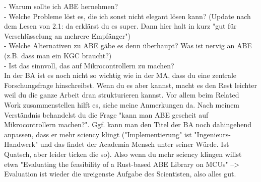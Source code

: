 - Warum sollte ich ABE hernehmen?\\ 
- Welche Probleme löst es, die ich sonst nicht elegant lösen kann? (Update nach dem Lesen von 2.1: da erklärst du es super. Dann hier halt in kurz "gut für Verschlüsselung an mehrere Empfänger") \\
- Welche Alternativen zu ABE gäbe es denn überhaupt? Was ist nervig an ABE (z.B. dass man ein KGC braucht?)\\
- Ist das sinnvoll, das auf Mikrocontrollern zu machen? \\

In der BA ist es noch nicht so wichtig wie in der MA, dass du eine zentrale Forschungsfrage hinschreibst. Wenn du es aber kannst, macht es den Rest leichter weil du die ganze Arbeit dran strukturieren kannst. Vor allem beim Related Work zusammenstellen hilft es, siehe meine Anmerkungen da. 
Nach meinem Verständnis behandelst du die Frage "kann man ABE gescheit auf Mikrocontrollern machen?". Ggf. kann man den Titel der BA noch dahingehend anpassen, dass er mehr sciency klingt ("Implementierung" ist "Ingenieurs-Handwerk" und das findet der Academia Mensch unter seiner Würde. Ist Quatsch, aber leider ticken die so). Also wenn du mehr sciency klingen willst etwa "Evaluating the feasibility of a Rust-based ABE Library on MCUs" --> Evaluation ist wieder die ureigenste Aufgabe des Scientisten, also alles gut.






